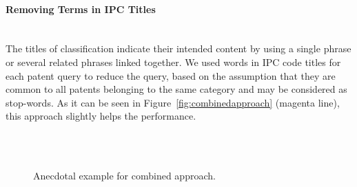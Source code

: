 \paragraph{Removing Terms in IPC Titles}
\ \\
The titles of classification indicate their intended content by using a single phrase or several related phrases linked together. We used words in IPC code titles for each patent query to reduce the query, based on the assumption that they are common to all patents belonging to the same category and may be considered as stop-words. As it can be seen in Figure~\ref{fig:combinedapproach} (magenta line), this approach slightly helps the performance.\\\\
\begin{figure}[t!]
\begin{centering}
 \hspace*{0.1cm}\\[1ex]%

\par\end{centering}

\protect\caption{Anecdotal example for combined approach.}
\label{fig:scatter_combined}
\end{figure}
